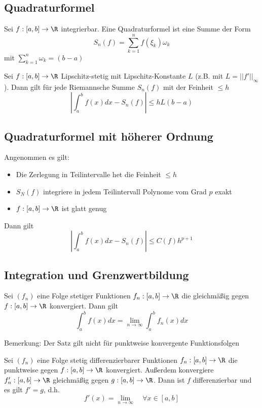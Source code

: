 	\subsection{Quadraturformel}
		\begin{Definition} [ Quadraturformel]
			Sei $f:[a, b]\to\R$ integrierbar. Eine Quadraturformel ist eine Summe der Form
			$$
				S_n(f)=\sum_{k=1}^nf(\xi_k)\omega_k
			$$
			mit $\displaystyle\sum_{k=1}^n\omega_k=(b-a)$
		\end{Definition}
		\begin{Satz} [ ]
			 Sei $f:[a, b]\to\R$ Lipschitz-stetig mit Lipschitz-Konstante $L$ (z.B. mit $L=||f'||_\infty$). Dann gilt für jede Riemannsche Summe $S_n(f)$ mit der Feinheit $\leq h$
			 $$
			 	|\int_a^bf(x)dx-S_n(f)|\leq hL(b-a)
			 $$
		\end{Satz}
	\subsection{Quadraturformel mit höherer Ordnung}
		\begin{Satz} [ Fehlerabschätzung]
			Angenommen es gilt:
			\begin{itemize}
				\item Die Zerlegung in Teilintervalle het die Feinheit $\leq h$
				\item $S_N(f)$ integriere in jedem Teilintervall Polynome vom Grad $p$ exakt
				\item $f:[a, b]\to\R$ ist glatt genug
			\end{itemize}
			Dann gilt
			$$
				|\int_a^bf(x)dx-S_n(f)|\leq C(f)h^{p+1}
			$$
		\end{Satz}
	\subsection{Integration und Grenzwertbildung}
		\begin{Satz} [ ]
			Sei $(f_n)$ eine Folge stetiger Funktionen $f_n:[a, b]\to\R$ die gleichmäßig gegen $f:[a, b]\to\R$ konvergiert. Dann gilt
			$$
				\int_a^bf(x)dx=\lim_{n\to\infty}\int_a^bf_n(x)dx
			$$
		\end{Satz}
		Bemerkung: \newline
		Der Satz gilt nicht für punktweise konvergente Funktionsfolgen
		\begin{Satz} [ ]
			Sei $(f_n)$ eine Folge stetig differenzierbarer Funktionen $f_n:[a, b]\to\R$ die punktweise gegen $f:[a, b]\to\R$ konvergiert. Außerdem konvergiere $f'_n:[a, b]\to\R$ gleichmäßig gegen $g:[a, b]\to\R$. Dann ist $f$ differenzierbar und es gilt $f'=g$, d.h.
			$$
				f'(x)=\lim_{n\to\infty} \quad \forall x \in [a, b]
			$$
		\end{Satz}
		
		
		
		
		
		
		
		